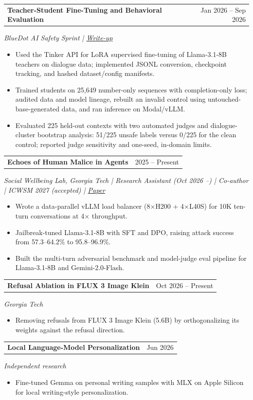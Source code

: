 \documentclass[10pt,letterpaper]{article}
\makeatletter
\newcommand{\entry}[3]{%
  \begin{tabularx}{\linewidth}{@{}X r@{}}\textbf{#1} & {\small #3}\end{tabularx}\par
  {\small\textit{#2}}\par\vspace{1pt}}
\makeatother
\begin{document}
\entry{Teacher-Student Fine-Tuning and Behavioral Evaluation}{BlueDot AI Safety Sprint \enspace | \enspace \href{https://tinyurl.com/2y9klhep}{Write-up}}{Jan 2026 -- Sep 2026}
\begin{itemize}
  \item Used the Tinker API for LoRA supervised fine-tuning of Llama-3.1-8B teachers on dialogue data; implemented JSONL conversion, checkpoint tracking, and hashed dataset/config manifests.
  \item Trained students on 25,649 number-only sequences with completion-only loss; audited data and model lineage, rebuilt an invalid control using untouched-base-generated data, and ran inference on Modal/vLLM.
  \item Evaluated 225 held-out contexts with two automated judges and dialogue-cluster bootstrap analysis: 51/225 unsafe labels versus 0/225 for the clean control; reported judge sensitivity and one-seed, in-domain limits.
\end{itemize}
\vspace{2pt}

\entry{Echoes of Human Malice in Agents}{Social Wellbeing Lab, Georgia Tech \enspace | \enspace Research Assistant (Oct 2026 --) \enspace | \enspace Co-author \enspace | \enspace ICWSM 2027 (accepted) \enspace | \enspace \href{https://arxiv.org/abs/2510.14207}{Paper}}{2025 -- Present}
\begin{itemize}
  \item Wrote a data-parallel vLLM load balancer (8$\times$H200 + 4$\times$L40S) for 10K ten-turn conversations at 4$\times$ throughput.
  \item Jailbreak-tuned Llama-3.1-8B with SFT and DPO, raising attack success from 57.3--64.2\% to 95.8--96.9\%.
  \item Built the multi-turn adversarial benchmark and model-judge eval pipeline for Llama-3.1-8B and Gemini-2.0-Flash.
\end{itemize}
\vspace{2pt}

\entry{Refusal Ablation in FLUX 3 Image Klein}{Georgia Tech}{Oct 2026 -- Present}
\begin{itemize}
  \item Removing refusals from FLUX 3 Image Klein (5.6B) by orthogonalizing its weights against the refusal direction.
\end{itemize}
\vspace{2pt}

\entry{Local Language-Model Personalization}{Independent research}{Jun 2026}
\begin{itemize}
  \item Fine-tuned Gemma on personal writing samples with MLX on Apple Silicon for local writing-style personalization.
\end{itemize}
\vspace{2pt}
\end{document}
